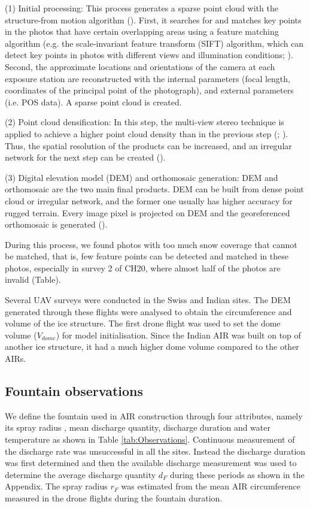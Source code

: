 \documentclass[utf8]{frontiersSCNS} %
\begin{document}
(1) Initial processing: This process generates a sparse point cloud with the structure-from motion algorithm
(\cite{Turner_2012}). First, it searches for and matches key points in the photos that have certain overlapping areas using a
feature matching algorithm (e.g. the scale-invariant feature transform (SIFT) algorithm, which can detect key points in
photos with different views and illumination conditions; \cite{Lowe_2004}). Second, the approximate locations and
orientations of the camera at each exposure station are reconstructed with the internal parameters (focal length,
coordinates of the principal point of the photograph), and external parameters (i.e. POS data). A sparse point cloud is
created.

(2) Point cloud densification: In this step, the multi-view stereo technique is applied to achieve a higher point cloud
density than in the previous step (\cite{Furukawa_2010}; \cite{Molg_2017}). Thus, the spatial resolution of the
products can be increased, and an irregular network for the next step can be created (\cite{Kung_2011}).

(3) Digital elevation model (DEM) and orthomosaic generation: DEM and orthomosaic are the two main final products. DEM
can be built from dense point cloud or irregular network, and the former one usually has higher accuracy for rugged
terrain. Every image pixel is projected on DEM and the georeferenced orthomosaic is generated (\cite{Kung_2011}).

During this process, we found photos with too much snow coverage that cannot be matched, that is, few feature points can
be detected and matched in these photos, especially in survey 2 of CH20, where almost half of the photos are invalid
(Table).

Several UAV surveys were conducted in the Swiss and Indian sites. The DEM generated through these flights were
analysed to obtain the circumference and volume of the ice structure. The first drone flight was used to set the dome
volume ($V_{dome}$) for model initialisation. Since the Indian AIR was built on top of another ice structure, it had
a much higher dome volume compared to the other AIRs.

\subsection{Fountain observations}
We define the fountain used in AIR construction through four attributes, namely its spray radius , mean discharge
quantity, discharge duration and water temperature as shown in Table \ref{tab:Observations}. Continuous measurement of
the discharge rate was unsuccessful in all the sites. Instead the discharge duration was first determined and then the
available discharge measurement was used to determine the average discharge quantity $d_F$ during these periods as shown
in the Appendix. The spray radius $r_F$ was estimated from the mean AIR circumference measured in the drone flights
during the fountain duration.
\end{document}
